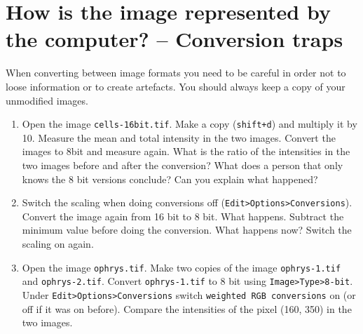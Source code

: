 \section{How is the image represented by the computer? -- Conversion traps}

When converting between image formats you need to be careful in order not to loose information or to create artefacts. You should always keep a copy of your unmodified images.

\begin{enumerate}
\item Open the image \texttt{cells-16bit.tif}. Make a copy (\texttt{shift+d}) and multiply it by 10. Measure the mean and total intensity in the two images. Convert the images to 8bit and measure again. What is the ratio of the intensities in the two images before and after the conversion? What does a person that only knows the 8 bit versions conclude? Can you explain what happened?

\fbox{
	\begin{minipage}{\linewidth}
		\hfill\vspace{2cm}
	\end{minipage}
	}
	
\item Switch the scaling when doing conversions off (\texttt{Edit>Options>Conversions}). Convert the image again from 16 bit to 8 bit. What happens. Subtract the minimum value before doing
the conversion. What happens now? Switch the scaling on again.

\fbox{
	\begin{minipage}{\linewidth}
		\hfill\vspace{2cm}
	\end{minipage}
	}
	
\item Open the image \texttt{ophrys.tif}. Make two copies of the image \texttt{ophrys-1.tif} and \texttt{ophrys-2.tif}. Convert \texttt{ophrys-1.tif} to 8 bit using \texttt{Image>Type>8-bit}. Under \texttt{Edit>Options>Conversions} switch \texttt{weighted RGB conversions} on (or off if it was on before). Compare the intensities of the pixel (160, 350) in the two images.

\fbox{
	\begin{minipage}{\linewidth}
		\hfill\vspace{1cm}
	\end{minipage}
	}

\end{enumerate}

